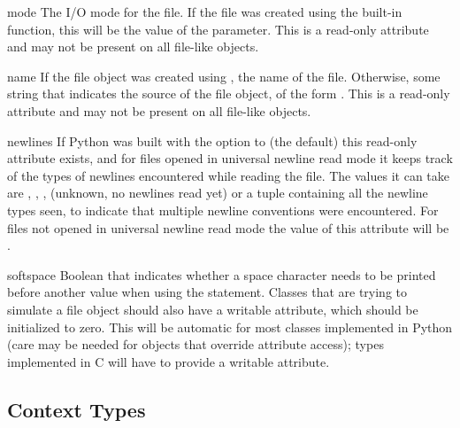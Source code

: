 \begin{memberdesc}[file]{mode}
The I/O mode for the file.  If the file was created using the
 built-in function, this will be the value of the
 parameter.  This is a read-only attribute and may not be
present on all file-like objects.
\end{memberdesc}

\begin{memberdesc}[file]{name}
If the file object was created using , the name of
the file.  Otherwise, some string that indicates the source of the
file object, of the form \samp{<\mbox{\ldots}>}.  This is a read-only
attribute and may not be present on all file-like objects.
\end{memberdesc}

\begin{memberdesc}[file]{newlines}
If Python was built with the 
option to  (the default) this read-only attribute
exists, and for files opened in
universal newline read mode it keeps track of the types of newlines
encountered while reading the file. The values it can take are
, , ,  (unknown,
no newlines read yet) or a tuple containing all the newline
types seen, to indicate that multiple
newline conventions were encountered. For files not opened in universal
newline read mode the value of this attribute will be .
\end{memberdesc}

\begin{memberdesc}[file]{softspace}
Boolean that indicates whether a space character needs to be printed
before another value when using the  statement.
Classes that are trying to simulate a file object should also have a
writable  attribute, which should be initialized to
zero.  This will be automatic for most classes implemented in Python
(care may be needed for objects that override attribute access); types
implemented in C will have to provide a writable
 attribute.
\end{memberdesc}


\subsection{Context Types \label{typecontext}}


